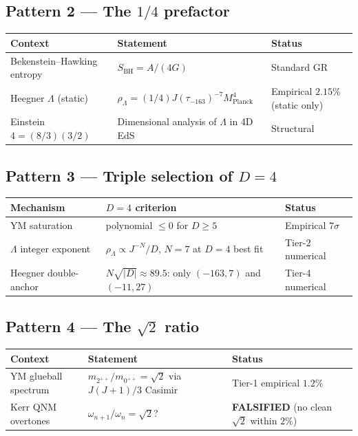 \documentclass[11pt,a4paper]{article}
\newcommand{\Planck}{\mathrm{Planck}}
\newcommand{\MP}{M_{\Planck}}
\newcommand{\BH}{\mathrm{BH}}
\begin{document}
\subsection*{Pattern 2 --- The $1/4$ prefactor}

\begin{tabularx}{\textwidth}{lXl}
\toprule
Context & Statement & Status \\
\midrule
Bekenstein--Hawking entropy & $S_{\BH} = A/(4G)$ & Standard GR \\
Heegner $\Lambda$ (static) & $\rho_\Lambda = (1/4) J(\tau_{-163})^{-7} \MP^4$ & Empirical $2.15\%$ (static only) \\
Einstein $4 = (8/3)(3/2)$ & Dimensional analysis of $\Lambda$ in 4D EdS & Structural \\
\bottomrule
\end{tabularx}

\subsection*{Pattern 3 --- Triple selection of $D = 4$}

\begin{tabularx}{\textwidth}{lXl}
\toprule
Mechanism & $D = 4$ criterion & Status \\
\midrule
YM saturation & polynomial $\leq 0$ for $D \geq 5$ & Empirical $7\sigma$ \\
$\Lambda$ integer exponent & $\rho_\Lambda \propto J^{-N}/D$, $N = 7$ at $D = 4$ best fit & Tier-2 numerical \\
Heegner double-anchor & $N \sqrt{|D|} \approx 89.5$: only $(-163, 7)$ and $(-11, 27)$ & Tier-4 numerical \\
\bottomrule
\end{tabularx}

\subsection*{Pattern 4 --- The $\sqrt{2}$ ratio}

\begin{tabularx}{\textwidth}{lXl}
\toprule
Context & Statement & Status \\
\midrule
YM glueball spectrum & $m_{2^{++}}/m_{0^{++}} = \sqrt{2}$ via $J(J+1)/3$ Casimir & Tier-1 empirical $1.2\%$ \\
Kerr QNM overtones & $\omega_{n+1}/\omega_n = \sqrt{2}$? & \textbf{FALSIFIED} (no clean $\sqrt{2}$ within $2\%$) \\
\bottomrule
\end{tabularx}
\end{document}
